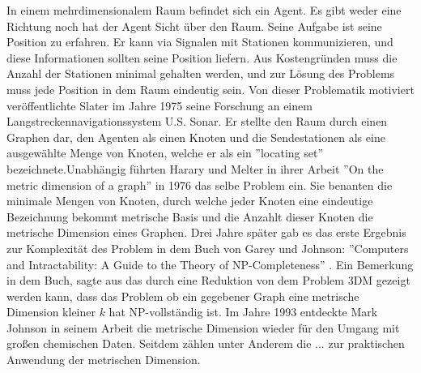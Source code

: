 In einem mehrdimensionalem Raum befindet sich ein Agent. Es gibt weder eine Richtung noch hat der Agent Sicht über den Raum. Seine Aufgabe ist seine Position zu erfahren. Er kann via Signalen mit Stationen kommunizieren, und diese Informationen sollten seine Position liefern. Aus Kostengründen muss die Anzahl der Stationen minimal gehalten werden, und zur Lösung des Problems muss jede Position in dem Raum eindeutig sein.\newline\newline 
Von dieser Problematik motiviert veröffentlichte Slater im Jahre 1975 \cite{slater} seine Forschung an einem Langstreckennavigationssystem U.S. Sonar. Er stellte den Raum durch einen Graphen dar, den Agenten als einen Knoten und die Sendestationen als eine ausgewählte Menge von Knoten, welche er als ein ''locating set'' bezeichnete.\newline\newline Unabhängig führten Harary und Melter in ihrer Arbeit ''On the metric dimension of a graph''\cite{harary} in 1976 das selbe Problem ein. Sie benanten die minimale Mengen von Knoten, durch welche jeder Knoten eine eindeutige Bezeichnung bekommt metrische Basis und die Anzahlt dieser Knoten die metrische Dimension eines Graphen.\newline\newline
Drei Jahre später gab es das erste Ergebnis zur Komplexität des Problem in dem Buch von Garey und Johnson: ''Computers and Intractability: A Guide to the Theory of NP-Completeness'' \cite{book}. Ein Bemerkung in dem Buch, sagte aus das durch eine Reduktion von dem Problem 3DM gezeigt werden kann, dass das Problem ob ein gegebener Graph eine metrische Dimension kleiner $k$ hat NP-vollständig ist. Im Jahre 1993 entdeckte Mark Johnson in seinem Arbeit \cite{drug} die metrische Dimension wieder für den Umgang mit großen chemischen Daten. Seitdem zählen unter Anderem die ... zur praktischen Anwendung der metrischen Dimension. \newline\newline
